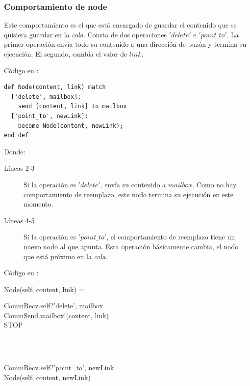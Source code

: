 \subsubsection*{Comportamiento de node}
Este comportamiento es el que está encargado de guardar el contenido que se quisiera guardar en la \textit{cola}. Consta de dos operaciones $'delete'$ e $'point\_to'$. La primer operación envía todo su contenido a una dirección de buzón y termina su ejecución. El segundo, cambia el valor de $link$.

Código en \SAL:

\begin{lstlisting}[language=sal, style=simple]
def Node(content, link) match
  ['delete', mailbox]:
    send [content, link] to mailbox
  ['point_to', newLink]:
    become Node(content, newLink);
end def
\end{lstlisting}

Donde:

\begin{description}
 \item [Líneas 2-3] Si la operación es $'delete'$, envía su contenido a $mailbox$. Como no hay comportamiento de reemplazo, este nodo termina su ejecución en este momento.
 \item [Líneas 4-5] Si la operación es $'point\_to'$, el comportamiento de reemplazo tiene un nuevo nodo al que apunta. Esta operación básicamente cambia, el nodo que está próximo en la \textit{cola}.
\end{description}

Código en \CSP:

\begin{process}
Node(self, content, link) = \\ \quad
  \begin{block}
  CommRecv.self?\langle 'delete', mailbox \rangle \then \\
  CommSend.mailbox!(content, link) \then \\
  STOP
  \end{block} \\

  \Extchoice \\ \quad
  
  \begin{block}
  CommRecv.self?\langle 'point\_to', newLink\rangle \then \\
  Node(self, content, newLink)
  \end{block}
\end{process}

